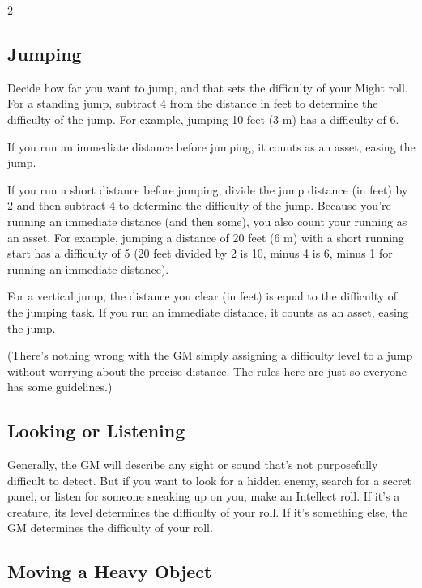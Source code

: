 \begin{multicols}{2}
\subsection{Jumping}

Decide how far you want to jump, and that sets the difficulty of your Might roll. For a standing jump, subtract 4 from the distance in feet to determine the difficulty of the jump. For example, jumping 10 feet (3 m) has a difficulty of 6.

If you run an immediate distance before jumping, it counts as an asset, easing the jump.

If you run a short distance before jumping, divide the jump distance (in feet) by 2 and then subtract 4 to determine the difficulty of the jump. Because you’re running an immediate distance (and then some), you also count your running as an asset. For example, jumping a distance of 20 feet (6 m) with a short running start has a difficulty of 5 (20 feet divided by 2 is 10, minus 4 is 6, minus 1 for running an immediate distance).

For a vertical jump, the distance you clear (in feet) is equal to the difficulty of the jumping task. If you run an immediate distance, it counts as an asset, easing the jump.

(There’s nothing wrong with the GM simply assigning a difficulty level to a jump without worrying about the precise distance. The rules here are just so everyone has some guidelines.)

\subsection{Looking or Listening}

Generally, the GM will describe any sight or sound that’s not purposefully difficult to detect. But if you want to look for a hidden enemy, search for a secret panel, or listen for someone sneaking up on you, make an Intellect roll. If it’s a creature, its level determines the difficulty of your roll. If it’s something else, the GM determines the difficulty of your roll.

\subsection{Moving a Heavy Object}


\end{multicols}
